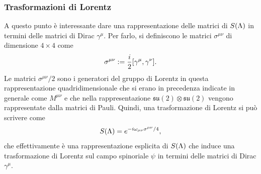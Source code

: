 \subsubsection{Trasformazioni di Lorentz}
A questo punto è interessante dare una rappresentazione delle matrici di $S(\Lambda)$ in termini delle matrici di Dirac $\gamma^\mu$. Per farlo, si definiscono le matrici $\sigma^{\mu\nu}$ di dimensione $4 \times 4$ come
\begin{equation}
    \sigma^{\mu\nu} := \frac{i}{2}[\gamma^\mu,\gamma^\nu].
\end{equation}
Le matrici $\sigma^{\mu\nu}/2$ sono i generatori del gruppo di Lorentz in questa rappresentazione quadridimensionale che si erano in precedenza indicate in generale come $M^{\mu\nu}$ e che nella rappresentazione $\mathfrak{su}(2)\otimes\mathfrak{su}(2)$ vengono rappresentate dalla matrici di Pauli. Quindi, una trasformazione di Lorentz si può scrivere come
\begin{equation}
\label{eq: S(lambda) in funzione delle gamma}
    S(\Lambda) = e^{-i\omega_{\mu\nu}\sigma^{\mu\nu}/4},
\end{equation}
che effettivamente è una rappresentazione esplicita di $S(\Lambda)$ che induce una trasformazione di Lorentz sul campo spinoriale $\psi$ in termini delle matrici di Dirac $\gamma^\mu$.

